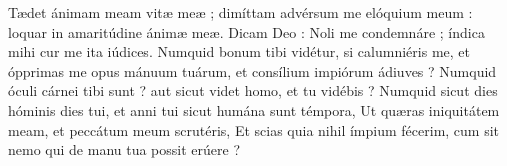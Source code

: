 
Tædet ánimam meam vitæ meæ ; dimíttam advérsum me elóquium meum : loquar in amaritúdine ánimæ meæ.
Dicam Deo : Noli me condemnáre ; índica mihi cur me ita iúdices.
Numquid bonum tibi vidétur, si calumniéris me, et ópprimas me opus mánuum tuárum, et consílium impiórum ádiuves ?
Numquid óculi cárnei tibi sunt ? aut sicut videt homo, et tu vidébis ?
Numquid sicut dies hóminis dies tui, et anni tui sicut humána sunt témpora,
Ut quæras iniquitátem meam, et peccátum meum scrutéris,
Et scias quia nihil ímpium fécerim, cum sit nemo qui de manu tua possit erúere ?